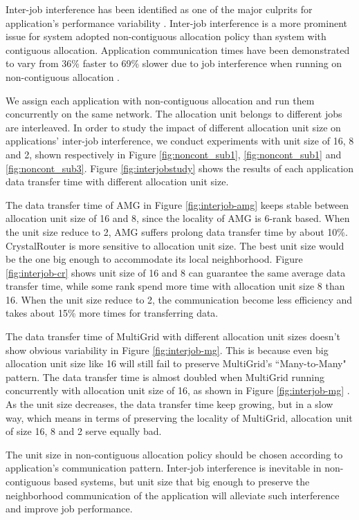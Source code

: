 \documentclass[conference]{IEEEtran}
\begin{document}
Inter-job interference has been identified as one of the major culprits for application's performance variability \cite{abhinav-sc13,skinner,rosenthal}. Inter-job interference is a more prominent issue for system adopted non-contiguous allocation policy than system with contiguous allocation. Application communication times have been demonstrated to vary from 36\% faster to 69\% slower due to job interference when running on non-contiguous allocation \cite{abhinav-sc13}.

We assign each application with non-contiguous allocation and run them concurrently on the same network. The allocation unit belongs to different jobs are interleaved. In order to study the impact of different allocation unit size on applications' inter-job interference, we conduct experiments with unit size of 16, 8 and 2, shown respectively in Figure \ref{fig:noncont_sub1}, \ref{fig:noncont_sub1} and \ref{fig:noncont_sub3}. Figure \ref{fig:interjobstudy} shows the results of each application data transfer time with different allocation unit size. 

The data transfer time of AMG in Figure \ref{fig:interjob-amg} keeps stable between allocation unit size of 16 and 8, since the locality of AMG is 6-rank based. When the unit size reduce to 2, AMG suffers prolong data transfer time by about 10\%. CrystalRouter is more sensitive to allocation unit size. The best unit size would be the one big enough to accommodate its local neighborhood. Figure \ref{fig:interjob-cr} shows unit size of 16 and 8 can guarantee the same average data transfer time, while some rank spend more time with allocation unit size 8 than 16. When the unit size reduce to 2, the communication become less efficiency and takes about 15\% more times for transferring data. 

The data transfer time of MultiGrid with different allocation unit sizes doesn't show obvious variability in Figure \ref{fig:interjob-mg}. This is because even big allocation unit size like 16 will still fail to preserve MultiGrid's ``Many-to-Many" pattern. The data transfer time is almost doubled when MultiGrid running concurrently with allocation unit size of 16, as shown in Figure \ref{fig:interjob-mg} . As the unit size decreases, the data transfer time keep growing, but in a slow way, which means in terms of preserving the locality of MultiGrid, allocation unit of size 16, 8 and 2 serve equally bad.

The unit size in non-contiguous allocation policy should be chosen according to application's communication pattern. Inter-job interference is inevitable in non-contiguous based systems, but unit size that big enough to preserve the neighborhood communication of the application will alleviate such interference and improve job performance. 
\end{document}
